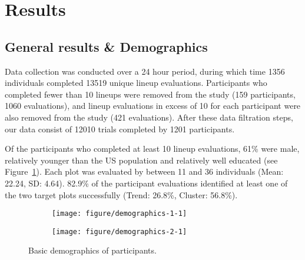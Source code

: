 \documentclass[12pt]{article}\usepackage[]{graphicx}\usepackage[]{color}
\newenvironment{knitrout}{}{} %
\begin{document}
\section{Results}\label{sec:Results}


\subsection{General results \& Demographics}
Data collection was conducted over a 24 hour period, 
during which time 1356 individuals completed 13519 unique lineup evaluations. 
Participants who completed fewer than 10 lineups were removed from the study (159 participants, 1060 evaluations), and lineup evaluations in excess of 10 for each participant were also removed from the study (421 evaluations). 
After these data filtration steps, our data consist of 12010 trials completed by 1201 participants. 

Of the participants who completed at least 10 lineup evaluations, 61\% were male, relatively younger than the US population and relatively well educated (see Figure~\ref{fig:demographics}). 
Each plot was evaluated by between 11 and 36 individuals 
(Mean: 22.24, SD: 4.64).
82.9\% of the participant evaluations identified at least one of the two target plots successfully (Trend: 26.8\%, Cluster: 56.8\%). 

\begin{figure}[ht]
\begin{subfigure}[t]{0.55\linewidth}
\begin{knitrout}
\color{fgcolor}

{\centering \texttt{[image: figure/demographics-1-1]} 

}



\end{knitrout}
\end{subfigure}
\begin{subfigure}[t]{0.43\linewidth}
\begin{knitrout}
\color{fgcolor}

{\centering \texttt{[image: figure/demographics-2-1]} 

}



\end{knitrout}
\end{subfigure}
\caption{\label{fig:demographics}Basic demographics of participants.}
\end{figure}
\end{document}
